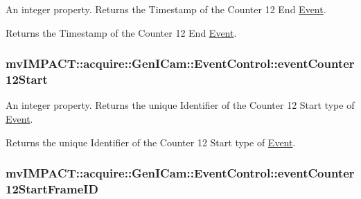 An integer property. Returns the Timestamp of the Counter 12 End \hyperlink{classmv_i_m_p_a_c_t_1_1acquire_1_1_event}{Event}. 

Returns the Timestamp of the Counter 12 End \hyperlink{classmv_i_m_p_a_c_t_1_1acquire_1_1_event}{Event}. \hypertarget{classmv_i_m_p_a_c_t_1_1acquire_1_1_gen_i_cam_1_1_event_control_a2e989c806a97bbc2f5eda2dc434eecda}{
\subsubsection[{event\+Counter12\+Start}]{ mv\+I\+M\+P\+A\+C\+T\+::acquire\+::\+Gen\+I\+Cam\+::\+Event\+Control\+::event\+Counter12\+Start}}\label{classmv_i_m_p_a_c_t_1_1acquire_1_1_gen_i_cam_1_1_event_control_a2e989c806a97bbc2f5eda2dc434eecda}


An integer property. Returns the unique Identifier of the Counter 12 Start type of \hyperlink{classmv_i_m_p_a_c_t_1_1acquire_1_1_event}{Event}. 

Returns the unique Identifier of the Counter 12 Start type of \hyperlink{classmv_i_m_p_a_c_t_1_1acquire_1_1_event}{Event}. \hypertarget{classmv_i_m_p_a_c_t_1_1acquire_1_1_gen_i_cam_1_1_event_control_abb0642df8115d4253262588cce2862c6}{
\subsubsection[{event\+Counter12\+Start\+Frame\+I\+D}]{ mv\+I\+M\+P\+A\+C\+T\+::acquire\+::\+Gen\+I\+Cam\+::\+Event\+Control\+::event\+Counter12\+Start\+Frame\+I\+D}}\label{classmv_i_m_p_a_c_t_1_1acquire_1_1_gen_i_cam_1_1_event_control_abb0642df8115d4253262588cce2862c6}


